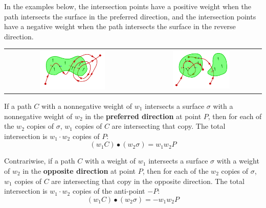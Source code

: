 In the examples below, the intersection points have a positive weight when the path intersects the surface in the preferred direction, and the intersection points have a negative weight when the path intersects the surface in the reverse direction.

\begin{tabular}{cc}
\includegraphics[width = 0.5\textwidth]{Intersections/Path-surface_intersections/path_surface_intersections}
& 
\includegraphics[width = 0.5\textwidth]{Intersections/Path-surface_intersections/path_surface_intersections_2}
\end{tabular}

If a path \(C\) with a nonnegative weight of \(w_1\) intersects a surface \(\sigma\) with a nonnegative weight of \(w_2\) in the {\bf preferred direction} at point \(P\), then for each of the \(w_2\) copies of \(\sigma\), \(w_1\) copies of \(C\) are intersecting that copy. The total intersection is \(w_1 \cdot w_2\) copies of \(P\):
\[(w_1 C) \bullet (w_2\sigma) = w_1 w_2 P\] 

Contrariwise, if a path \(C\) with a weight of \(w_1\) intersects a surface \(\sigma\) with a weight of \(w_2\) in the {\bf opposite direction} at point \(P\), then for each of the \(w_2\) copies of \(\sigma\), \(w_1\) copies of \(C\) are intersecting that copy in the opposite direction. The total intersection is \(w_1 \cdot w_2\) copies of the anti-point \(-P\):
\[(w_1 C) \bullet (w_2 \sigma) = -w_1 w_2 P\]  

